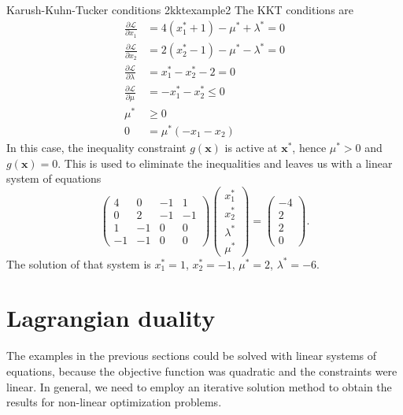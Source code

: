 \begin{example}{Karush-Kuhn-Tucker conditions 2}{kktexample2}
    The KKT conditions are 
    \begin{align}
        \frac{\partial \mathcal{\mathcal{L}}}{\partial x_1} &= 4 (x_1^* + 1) - \mu^* + \lambda^*  = 0\\
        \frac{\partial \mathcal{\mathcal{L}}}{\partial x_2} &= 2 (x_2^* - 1) - \mu^* - \lambda^*  = 0\\
        \frac{\partial \mathcal{\mathcal{L}}}{\partial \lambda} &= x_1^* - x_2^* - 2 = 0 \\
        \label{eq:kkt_example2_in}
        \frac{\partial \mathcal{\mathcal{L}}}{\partial \mu} &= -x_1^*-x_2^* \le 0 \\
        \mu^* &\ge 0 \\
        0 &= \mu^*(-x_1-x_2)
        \label{eq:kkt_example2_comp}
    \end{align}
    In this case, the inequality constraint $g(\mathbf{x})$ is active at $\mathbf{x}^*$, hence $\mu^* > 0$ and $g(\mathbf{x})=0$. This is used to eliminate the inequalities and leaves us with a linear system of equations 
    \begin{equation}
        \begin{pmatrix}
        4  & 0  & -1 & 1  \\
        0  & 2  & -1 & -1 \\ 
        1  & -1 & 0  & 0  \\
        -1 & -1 & 0  & 0
        \end{pmatrix} 
        \begin{pmatrix}
        x_1^* \\ x_2^* \\ \lambda^* \\ \mu^*  
        \end{pmatrix} 
        = 
        \begin{pmatrix}
        -4 \\ 2 \\ 2\\ 0
        \end{pmatrix} 
        .
    \end{equation}
    The solution of that system is $x_1^*=1$, $x_2^*=-1$, $\mu^*=2$, $\lambda^*=-6$.
\end{example}

\section{Lagrangian duality}
The examples in the previous sections could be solved with linear systems of equations, because the objective function was quadratic and the constraints were linear. In general, we need to employ an iterative solution method to obtain the results for non-linear optimization problems. 

